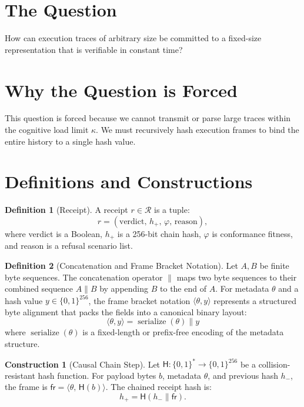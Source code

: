 \documentclass[11pt,oneside]{book}
\theoremstyle{definition}
\newtheorem{definition}{Definition}[chapter]
\newtheorem{construction}{Construction}[chapter]
\theoremstyle{plain}
\theoremstyle{remark}
\newcommand{\Rec}{\mathcal{R}}                 %
\newcommand{\chainH}{\mathsf{H}}               %
\newcommand{\Fitness}{\varphi}
\begin{document}
\section{The Question}
How can execution traces of arbitrary size be committed to a fixed-size representation that is verifiable in constant time? %

\section{Why the Question is Forced}
This question is forced because we cannot transmit or parse large traces within the cognitive load limit $\kappa$. %
We must recursively hash execution frames to bind the entire history to a single hash value. %

\section{Definitions and Constructions}

\begin{definition}[Receipt]\label{def:receipt_def}
A receipt $r \in \Rec$ is a tuple:
\[
r = (\text{verdict},\, h_+,\, \Fitness,\, \text{reason}),
\]
where verdict is a Boolean, $h_+$ is a 256-bit chain hash, $\Fitness$ is conformance fitness, and reason is a refusal scenario list. %
\end{definition}

\begin{definition}[Concatenation and Frame Bracket Notation]\label{def:bracket_concat}
Let $A, B$ be finite byte sequences. The concatenation operator $\parallel$ maps two byte sequences to their combined sequence $A \parallel B$ by appending $B$ to the end of $A$. %
For metadata $\theta$ and a hash value $y \in \{0, 1\}^{256}$, the frame bracket notation $\langle \theta, y \rangle$ represents a structured byte alignment that packs the fields into a canonical binary layout:
\[
\langle \theta, y \rangle = \operatorname{serialize}(\theta) \parallel y
\]
where $\operatorname{serialize}(\theta)$ is a fixed-length or prefix-free encoding of the metadata structure. %
\end{definition}

\begin{construction}[Causal Chain Step]\label{con:chain_step}
Let $\chainH: \{0,1\}^* \to \{0,1\}^{256}$ be a collision-resistant hash function. %
For payload bytes $b$, metadata $\theta$, and previous hash $h_-$, the frame is $\mathsf{fr} = \langle\theta,\, \chainH(b)\rangle$. %
The chained receipt hash is:
\begin{equation}\label{eq:hash_chain}
h_+ = \chainH(h_- \parallel \mathsf{fr}).
\end{equation} %
\end{construction}
\end{document}
